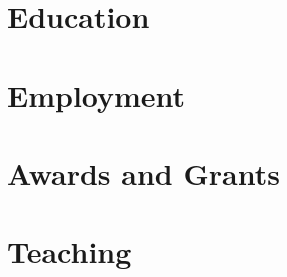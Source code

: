 \documentclass{prometheus_cv}
\begin{document}
\thispagestyle{empty}					%
\pagestyle{fancy}			 		%

\vspace*{-1cm}
\centering 





\vspace*{0cm}

\section{Education}



\section{Employment}


\section{Awards and Grants}


\section{Teaching}

\end{document}
